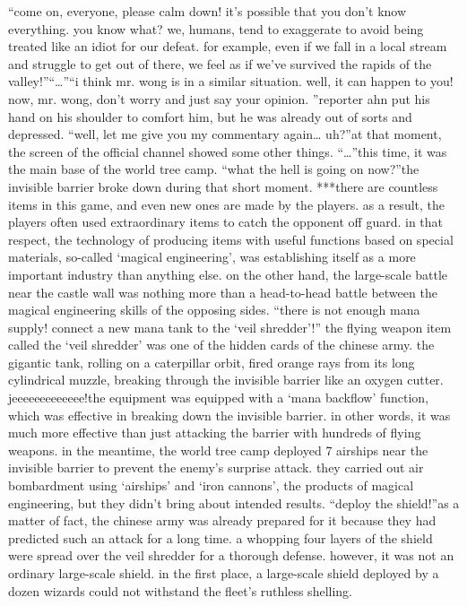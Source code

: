 “come on, everyone, please calm down! it’s possible that you don’t know everything.
 you know what? we, humans, tend to exaggerate to avoid being treated like an idiot for our defeat.
 for example, even if we fall in a local stream and struggle to get out of there, we feel as if we’ve survived the rapids of the valley!”“…”“i think mr.
 wong is in a similar situation.
 well, it can happen to you! now, mr.
 wong, don’t worry and just say your opinion.
”reporter ahn put his hand on his shoulder to comfort him, but he was already out of sorts and depressed.
“well, let me give you my commentary again… uh?”at that moment, the screen of the official channel showed some other things.
“…”this time, it was the main base of the world tree camp.
“what the hell is going on now?”the invisible barrier broke down during that short moment.
***there are countless items in this game, and even new ones are made by the players.
as a result, the players often used extraordinary items to catch the opponent off guard.
in that respect, the technology of producing items with useful functions based on special materials, so-called ‘magical engineering’, was establishing itself as a more important industry than anything else.
on the other hand, the large-scale battle near the castle wall was nothing more than a head-to-head battle between the magical engineering skills of the opposing sides.
“there is not enough mana supply! connect a new mana tank to the ‘veil shredder’!”
the flying weapon item called the ‘veil shredder’ was one of the hidden cards of the chinese army.
 the gigantic tank, rolling on a caterpillar orbit, fired orange rays from its long cylindrical muzzle, breaking through the invisible barrier like an oxygen cutter.
jeeeeeeeeeeeee!the equipment was equipped with a ‘mana backflow’ function, which was effective in breaking down the invisible barrier.
 in other words, it was much more effective than just attacking the barrier with hundreds of flying weapons.
in the meantime, the world tree camp deployed 7 airships near the invisible barrier to prevent the enemy’s surprise attack.
 they carried out air bombardment using ‘airships’ and ‘iron cannons’, the products of magical engineering, but they didn’t bring about intended results.
“deploy the shield!”as a matter of fact, the chinese army was already prepared for it because they had predicted such an attack for a long time.
a whopping four layers of the shield were spread over the veil shredder for a thorough defense.
however, it was not an ordinary large-scale shield.
 in the first place, a large-scale shield deployed by a dozen wizards could not withstand the fleet’s ruthless shelling.
